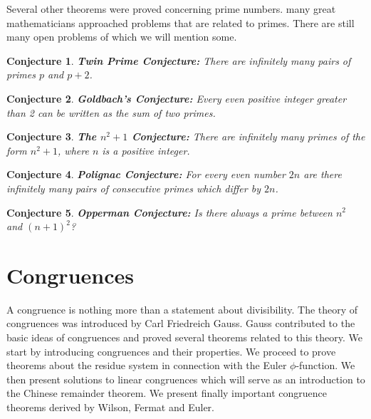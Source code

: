 \documentclass[12pt,letterpaper]{book}
\newtheorem{conjecture}{Conjecture}
\begin{document}
\par Several other theorems were proved concerning prime numbers.
many great mathematicians approached problems that are related to
primes.  There are still many open problems of which we will
mention some.\\

\begin{conjecture} 
\textbf{Twin Prime Conjecture:}  There are infinitely many pairs
of primes $p$ and $p+2$.
\end{conjecture}

\begin{conjecture} 
\textbf{Goldbach's Conjecture:} Every even positive integer greater
than 2 can be written as the sum of two primes.
\end{conjecture}

\begin{conjecture}
\textbf{The $n^2+1$ Conjecture:} There are infinitely many primes of
the form $n^2+1$, where $n$ is a positive integer.
\end{conjecture}

\begin{conjecture} 
\textbf{Polignac Conjecture:} For every even number $2n$ are there
infinitely many pairs of consecutive primes which differ by $2n$.
\end{conjecture}

\begin{conjecture}
\textbf{Opperman Conjecture:} Is there always a prime between $n^2$
and $(n+1)^2$?
\end{conjecture}







\chapter{Congruences}

A congruence is nothing more than a statement about divisibility.
The theory of congruences was introduced by Carl Friedreich Gauss.
Gauss contributed to the basic ideas of congruences and proved
several theorems related to this theory. We start by introducing
congruences and their properties.  We proceed to prove theorems
about the residue system in connection with the Euler
$\phi$-function.  We then present solutions to linear congruences
which will serve as an introduction to the Chinese remainder
theorem.    We present finally important congruence theorems derived
by Wilson, Fermat and Euler.
\end{document}
